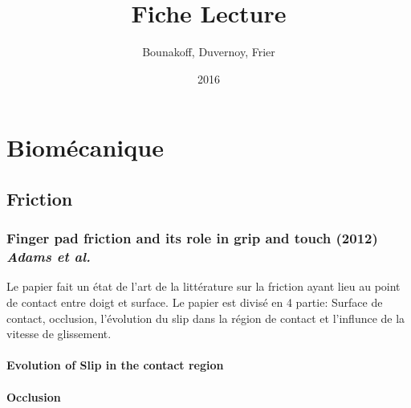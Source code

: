 \documentclass{article}
\title{Fiche Lecture}
\author{Bounakoff, Duvernoy, Frier}
\date{2016}
\begin{document}
	\maketitle
	\section{Biom\'{e}canique}
	\subsection{Friction}
	\subsubsection {Finger pad friction and its role in grip and touch (2012) \textit{Adams et al.} }
	Le papier fait un \'{e}tat de l'art de la litt\'{e}rature sur la friction ayant lieu au point de contact entre doigt et surface.
	Le papier est divis\'{e} en 4 partie: Surface de contact, occlusion, l'\'{e}volution du slip dans la r\'{e}gion de contact et l'influnce de la vitesse de glissement.

	\paragraph {Evolution of Slip in the contact region}
	

	\paragraph {Occlusion}
	
\end{document}
